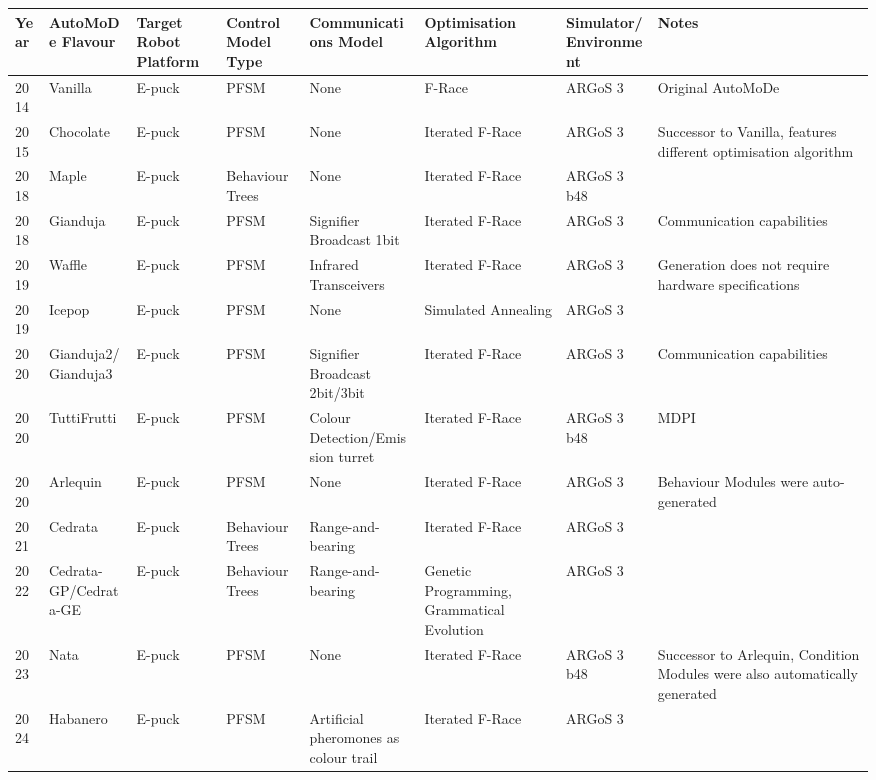 \documentclass{article}
\begin{document}
\begin{table}[!ht]
	\centering
	\begin{tabular}{|l|l|l|l|l|l|l|l|}
		\hline
		Year & AutoMoDe Flavour & Target Robot Platform & Control Model Type & Communications Model & Optimisation Algorithm & Simulator/Environment & Notes \\ \hline
		2014 & Vanilla & E-puck & PFSM & None & F-Race & ARGoS 3 & Original AutoMoDe \\ \hline
		2015 & Chocolate & E-puck & PFSM & None & Iterated F-Race & ARGoS 3 & Successor to Vanilla, features different optimisation algorithm \\ \hline
		2018 & Maple & E-puck & Behaviour Trees & None & Iterated F-Race & ARGoS 3 b48 & ~ \\ \hline
		2018 & Gianduja & E-puck & PFSM & Signifier Broadcast 1bit & Iterated F-Race & ARGoS 3 & Communication capabilities \\ \hline
		2019 & Waffle & E-puck & PFSM & Infrared Transceivers & Iterated F-Race & ARGoS 3 & Generation does not require hardware specifications \\ \hline
		2019 & Icepop & E-puck & PFSM & None & Simulated Annealing & ARGoS 3 & ~ \\ \hline
		2020 & Gianduja2/Gianduja3 & E-puck & PFSM & Signifier Broadcast 2bit/3bit & Iterated F-Race & ARGoS 3 & Communication capabilities \\ \hline
		2020 & TuttiFrutti & E-puck & PFSM & Colour Detection/Emission turret & Iterated F-Race & ARGoS 3 b48 & MDPI \\ \hline
		2020 & Arlequin & E-puck & PFSM & None & Iterated F-Race & ARGoS 3 & Behaviour Modules were auto-generated \\ \hline
		2021 & Cedrata & E-puck & Behaviour Trees & Range-and-bearing & Iterated F-Race & ARGoS 3 & ~ \\ \hline
		2022 & Cedrata-GP/Cedrata-GE & E-puck & Behaviour Trees & Range-and-bearing & Genetic Programming, Grammatical Evolution & ARGoS 3 & ~ \\ \hline
		2023 & Nata & E-puck & PFSM & None & Iterated F-Race & ARGoS 3 b48 & Successor to Arlequin, Condition Modules were also automatically generated \\ \hline
		2024 & Habanero & E-puck & PFSM & Artificial pheromones as colour trail & Iterated F-Race & ARGoS 3 & ~ \\ \hline
	\end{tabular}
\end{table}
\end{document}
